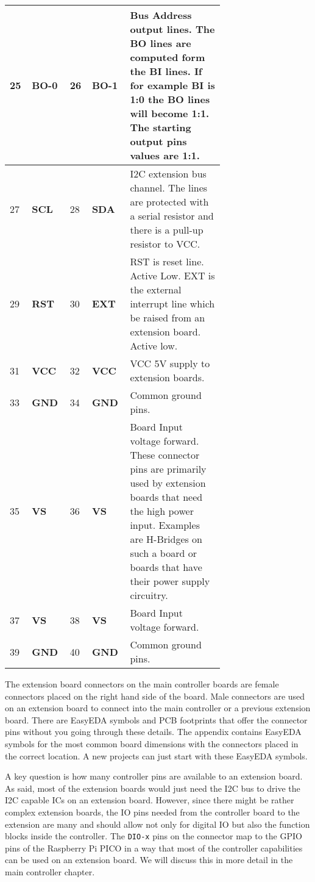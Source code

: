 \begin{longtable}{@{}|p{0.05\linewidth}|p{0.1\linewidth}|p{0.05\linewidth}|p{0.1\linewidth}|p{0.4\linewidth}|@{}}
    \midrule
    25 & \textbf{BO-0} & 26 & \textbf{BO-1} & Bus Address output lines. The BO lines are computed form the BI lines. If for example BI is 1:0 the BO lines will become 1:1. The starting output pins values are 1:1. \\ 
    \midrule
    27 & \textbf{SCL} &  28 & \textbf{SDA} & I2C extension bus channel.  The lines are protected with a serial resistor and there is a pull-up resistor to VCC. \\
    \midrule
    29 & \textbf{RST} & 30 & \textbf{EXT} & RST is reset line. Active Low. EXT is the external interrupt line which be raised from an extension board. Active low. \\
    \midrule
    31 & \textbf{VCC} & 32 & \textbf{VCC} & VCC 5V supply to extension boards. \\
    \midrule
    33 & \textbf{GND} & 34 & \textbf{GND} & Common ground pins. \\
    \midrule
    35 & \textbf{VS} & 36 & \textbf{VS} & Board Input voltage forward. These connector pins are primarily used by extension boards that need the high power input. Examples are H-Bridges on such a board or boards that have their power supply circuitry. \\
    \midrule
    37 & \textbf{VS} & 38 & \textbf{VS} & Board Input voltage forward. \\
    \midrule
    39 & \textbf{GND} & 40 & \textbf{GND} & Common ground pins. \\
\end{longtable}  

The extension board connectors on the main controller boards are female connectors placed on the right hand side of the board. Male connectors are used on an extension board to connect into the main controller or a previous extension board. There are EasyEDA symbols and PCB footprints that offer the connector pins without you going through these details. The appendix contains EasyEDA symbols for the most common board dimensions with the connectors placed in the correct location. A new projects can just start with these EasyEDA symbols.

A key question is how many controller pins are available to an extension board. As said, most of the extension boards would just need the I2C bus to drive the I2C capable ICs on an extension board. However, since there might be rather complex extension boards, the IO pins needed from the controller board to the extension are many and should allow not only for digital IO but also the function blocks inside the controller. The \texttt{DIO-x} pins on the connector map to the GPIO pins of the Raspberry Pi PICO in a way that most of the controller capabilities can be used on an extension board. We will discuss this in more detail in the main controller chapter.

